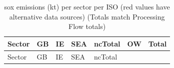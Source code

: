 \documentclass[
]{article}
\begin{document}
\begin{longtable}[]{@{}
  >{\raggedleft\arraybackslash}p{}
  >{\centering\arraybackslash}p{}
  >{\centering\arraybackslash}p{}
  >{\centering\arraybackslash}p{}
  >{\centering\arraybackslash}p{}
  >{\centering\arraybackslash}p{}
  >{\centering\arraybackslash}p{}@{}}
\caption{sox emissions (kt) per sector per ISO (red values have
alternative data sources) (Totals match Processing Flow
totals)}\tabularnewline
\toprule\noalign{}
\begin{minipage}[b]{\linewidth}\raggedleft
Sector
\end{minipage} & \begin{minipage}[b]{\linewidth}\centering
GB
\end{minipage} & \begin{minipage}[b]{\linewidth}\centering
IE
\end{minipage} & \begin{minipage}[b]{\linewidth}\centering
SEA
\end{minipage} & \begin{minipage}[b]{\linewidth}\centering
ncTotal
\end{minipage} & \begin{minipage}[b]{\linewidth}\centering
OW
\end{minipage} & \begin{minipage}[b]{\linewidth}\centering
Total
\end{minipage} \\
\midrule\noalign{}
\endfirsthead
\toprule\noalign{}
\begin{minipage}[b]{\linewidth}\raggedleft
Sector
\end{minipage} & \begin{minipage}[b]{\linewidth}\centering
GB
\end{minipage} & \begin{minipage}[b]{\linewidth}\centering
IE
\end{minipage} & \begin{minipage}[b]{\linewidth}\centering
SEA
\end{minipage} & \begin{minipage}[b]{\linewidth}\centering
ncTotal
\end{minipage} & \begin{minipage}[b]{\linewidth}\centering

\end{minipage}
\end{longtable}
\end{document}
